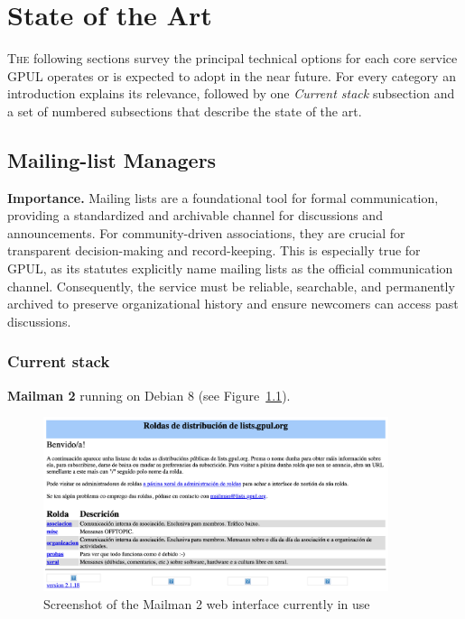 %

\chapter{State of the Art}
\label{chap:state-of-the-art}

\lettrine{T}{he} following sections survey the principal technical options for each core service GPUL operates or is expected to adopt in the near future.  
For every category an introduction explains its relevance, followed by one \emph{Current stack} subsection and a set of numbered subsections that describe the state of the art.  

\section{Mailing-list Managers}

\textbf{Importance.} Mailing lists are a foundational tool for formal communication, providing a standardized and archivable channel for discussions and announcements. For community-driven associations, they are crucial for transparent decision-making and record-keeping. This is especially true for GPUL, as its statutes explicitly name mailing lists as the official communication channel. Consequently, the service must be reliable, searchable, and permanently archived to preserve organizational history and ensure newcomers can access past discussions.

\subsection*{Current stack}
\textbf{Mailman 2} running on Debian 8 (see Figure~\ref{fig:mailman2}).

\begin{figure}[h!]
  \centering
  \includegraphics[width=0.9\textwidth]{imaxes/mailman-2-current.png}
  \caption{Screenshot of the Mailman 2 web interface currently in use}
  \label{fig:mailman2}
\end{figure}

